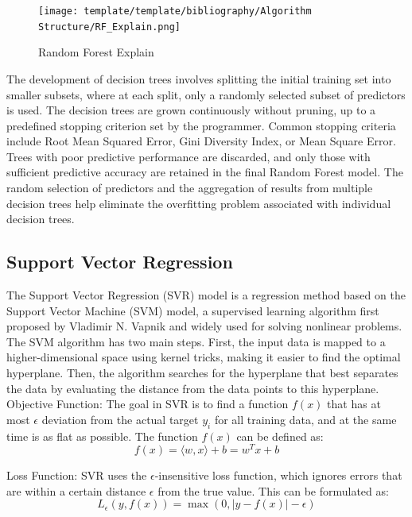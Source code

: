 \documentclass{ieeeojies}
\begin{document}
\begin{figure}[H]
    \centering
    \texttt{[image: template/template/bibliography/Algorithm Structure/RF\_Explain.png]}
    \caption{Random Forest Explain}
    \label{fig:1}
\end{figure}

The development of decision trees involves splitting the initial training set into smaller subsets, where at each split, only a randomly selected subset of predictors is used. The decision trees are grown continuously without pruning, up to a predefined stopping criterion set by the programmer. Common stopping criteria include Root Mean Squared Error, Gini Diversity Index, or Mean Square Error. Trees with poor predictive performance are discarded, and only those with sufficient predictive accuracy are retained in the final Random Forest model. The random selection of predictors and the aggregation of results from multiple decision trees help eliminate the overfitting problem associated with individual decision trees. 
\subsection{Support Vector Regression}

The Support Vector Regression (SVR) model is a regression method based on the Support Vector Machine (SVM) model, a supervised learning algorithm first proposed by Vladimir N. Vapnik and widely used for solving nonlinear problems. The SVM algorithm has two main steps. First, the input data is mapped to a higher-dimensional space using kernel tricks, making it easier to find the optimal hyperplane. Then, the algorithm searches for the hyperplane that best separates the data by evaluating the distance from the data points to this hyperplane. \\

Objective Function: The goal in SVR is to find a function \( f(x) \) that has at most \(\epsilon\) deviation from the actual target \( y_i \) for all training data, and at the same time is as flat as possible. The function \( f(x) \) can be defined as: \\
\[f(x) = \langle w, x \rangle + b = w^T x + b\]

Loss Function: SVR uses the \(\epsilon\)-insensitive loss function, which ignores errors that are within a certain distance \(\epsilon\) from the true value. This can be formulated as: \\
\[L_{\epsilon}(y, f(x)) = \max(0, |y - f(x)| - \epsilon)\] 
\end{document}
